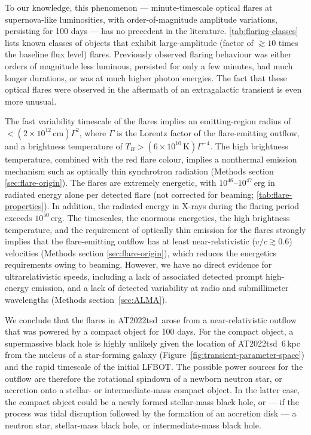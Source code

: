 \documentclass{nature_plusfigure}
\newcommand{\at}{AT2022tsd}
\begin{document}
To our knowledge, this phenomenon --- minute-timescale optical flares at supernova-like luminosities, with order-of-magnitude amplitude variations, persisting for 100 days --- has no precedent in the literature.
\ref{tab:flaring-classes} lists known classes of objects that exhibit large-amplitude (factor of $\gtrsim10$ times the baseline flux level) flares. Previously observed flaring behaviour was either orders of magnitude less luminous, persisted for only a few minutes, had much longer durations, or was at much higher photon energies.
The fact that these optical flares were observed in the aftermath of an extragalactic transient is even more unusual.

The fast variability timescale of the flares implies an emitting-region radius of $<(2\times10^{12}\,\mathrm{cm}) \Gamma^2$, where $\Gamma$ is the Lorentz factor of the flare-emitting outflow,
and a brightness temperature of $T_B>(6\times10^{10}\,\mathrm{K})\Gamma^{-4}$.
The high brightness temperature, combined with the red flare colour, implies a nonthermal emission mechanism such as optically thin synchrotron radiation (Methods section \ref{sec:flare-origin}).
The flares are extremely energetic, with $10^{46}$--$10^{47}$\,erg in radiated energy alone per detected flare (not corrected for beaming; \ref{tab:flare-properties}).
In addition, the radiated energy in X-rays during the flaring period exceeds $10^{50}$\,erg.
The timescales, the enormous energetics, the high brightness temperature, and the requirement of optically thin emission for the flares strongly implies that the flare-emitting outflow has at least near-relativistic ($v/c\gtrsim0.6$) velocities (Methods section \ref{sec:flare-origin}),
which reduces the energetics requirements owing to beaming.
However, we have no direct evidence for ultrarelativistic speeds, including a lack of associated detected prompt high-energy emission,
and a lack of detected variability at radio and submillimeter wavelengths (Methods section~\ref{sec:ALMA}).

We conclude that the flares in \at\ arose from a near-relativistic outflow that was powered by a compact object for 100 days. For the compact object, a supermassive black hole is highly unlikely given the location of \at\ 6\,kpc from the nucleus of a star-forming galaxy (Figure~\ref{fig:transient-parameter-space}) and the rapid timescale of the initial LFBOT. The possible power sources for the outflow are therefore the rotational spindown of a newborn neutron star, or accretion onto a stellar- or intermediate-mass compact object. In the latter case, the compact object could be a newly formed stellar-mass black hole, or --- if the process was tidal disruption followed by the formation of an accretion disk --- a neutron star, stellar-mass black hole, or intermediate-mass black hole. 
\end{document}
